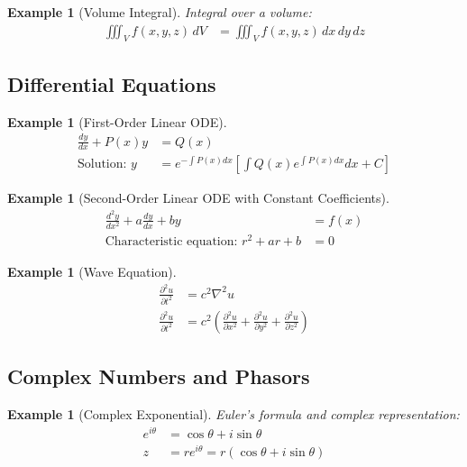 \documentclass{article}
\newtheorem{example}[theorem]{Example}
\begin{document}
\begin{example}[Volume Integral]
Integral over a volume:
\begin{align*}
    \iiint_V f(x,y,z) \, dV &= \iiint_V f(x,y,z) \, dx \, dy \, dz
\end{align*}
\end{example}

\subsection{Differential Equations}

\begin{example}[First-Order Linear ODE]
\begin{align*}
    \frac{dy}{dx} + P(x)y &= Q(x) \\
    \text{Solution: } y &= e^{-\int P(x)dx}\left[\int Q(x)e^{\int P(x)dx}dx + C\right]
\end{align*}
\end{example}

\begin{example}[Second-Order Linear ODE with Constant Coefficients]
\begin{align*}
    \frac{d^2y}{dx^2} + a\frac{dy}{dx} + by &= f(x) \\
    \text{Characteristic equation: } r^2 + ar + b &= 0
\end{align*}
\end{example}

\begin{example}[Wave Equation]
\begin{align*}
    \frac{\partial^2 u}{\partial t^2} &= c^2\nabla^2 u \\
    \frac{\partial^2 u}{\partial t^2} &= c^2\left(\frac{\partial^2 u}{\partial x^2} + \frac{\partial^2 u}{\partial y^2} + \frac{\partial^2 u}{\partial z^2}\right)
\end{align*}
\end{example}

\subsection{Complex Numbers and Phasors}

\begin{example}[Complex Exponential]
Euler's formula and complex representation:
\begin{align*}
    e^{i\theta} &= \cos\theta + i\sin\theta \\
    z &= re^{i\theta} = r(\cos\theta + i\sin\theta)
\end{align*}
\end{example}
\end{document}
